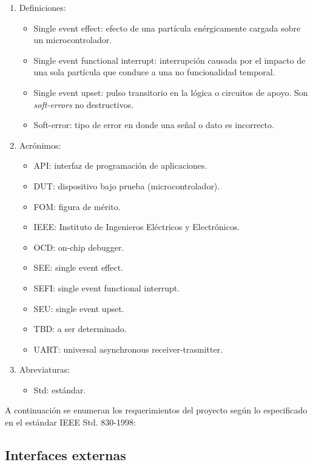\documentclass[
11pt, %
]{charter}
\begin{document}
\begin{enumerate}
	\item Definiciones:
	\begin{itemize}
		\item Single event effect: efecto de una partícula enérgicamente cargada sobre un microcontrolador.
		\item Single event functional interrupt: interrupción causada por el impacto de una sola partícula que conduce a una no funcionalidad temporal.
		\item Single event upset: pulso transitorio en la lógica o circuitos de apoyo. Son \emph{soft-errors} no destructivos.
		\item Soft-error: tipo de error en donde una señal o dato es incorrecto.
	\end{itemize}
	\item Acrónimos:
	\begin{itemize}
		\item API: interfaz de programación de aplicaciones.
		\item DUT: dispositivo bajo prueba (microcontrolador).
		\item FOM: figura de mérito.
		\item IEEE: Instituto de Ingenieros Eléctricos y Electrónicos.
		\item OCD: on-chip debugger.
		\item SEE: single event effect.
		\item SEFI: single event functional interrupt.
		\item SEU: single event upset.
		\item TBD: a ser determinado.
		\item UART: universal asynchronous receiver-trasmitter.
	\end{itemize}
	\item Abreviaturas:
	\begin{itemize}
		\item Std: estándar.
	\end{itemize}
\end{enumerate}

A continuación se enumeran los requerimientos del proyecto según lo especificado en el estándar IEEE Std. 830-1998:

\subsection{Interfaces externas}
\label{sub:interfacesExternas}
\end{document}
